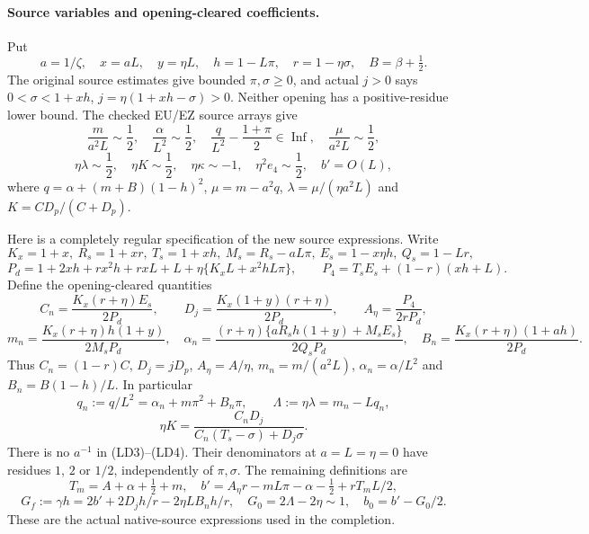 \paragraph{Source variables and opening-cleared coefficients.}
Put
\[
 a=1/\zeta,\quad x=aL,\quad y=\eta L,\quad
 h=1-L\pi,\quad r=1-\eta\sigma,\quad B=\beta+\tfrac12.
\]
The original source estimates give bounded $\pi,\sigma\ge0$, and
actual $j>0$ says
$0<\sigma<1+xh$, $j=\eta(1+xh-\sigma)>0$.
Neither opening has a positive-residue lower bound.
The checked EU/EZ source arrays give
\[
 \frac{m}{a^2L}\sim\frac12,\quad
 \frac{\alpha}{L^2}\sim\frac12,\quad
 \frac{q}{L^2}-\frac{1+\pi}{2}\in\operatorname{Inf},\quad
 \frac{\mu}{a^2L}\sim\frac12,
\]
\[
 \eta\lambda\sim\frac12,\quad
 \eta K\sim\frac12,\quad
 \eta\kappa\sim-1,\quad \eta^2e_4\sim\frac12,
 \quad b'=O(L),                                     \tag{LD2}
\]
where $q=\alpha+(m+B)(1-h)^2$, $\mu=m-a^2q$,
$\lambda=\mu/(\eta a^2L)$ and $K=CD_p/(C+D_p)$.

Here is a completely regular specification of the new source
expressions. Write
\[
 K_x=1+x,\ R_s=1+xr,\ T_s=1+xh,\ M_s=R_s-aL\pi,
 \ E_s=1-x\eta h,\ Q_s=1-Lr,
\]
\[
 P_d=1+2xh+rx^2h+rxL+L
                  +\eta\{K_xL+x^2hL\pi\},\qquad
 P_4=T_sE_s+(1-r)(xh+L).
\]
Define the opening-cleared quantities
\[
 C_n=\frac{K_x(r+\eta)E_s}{2P_d},\qquad
 D_j=\frac{K_x(1+y)(r+\eta)}{2P_d},\qquad
 A_\eta=\frac{P_4}{2rP_d},
\]
\[
 m_n=\frac{K_x(r+\eta)h(1+y)}{2M_sP_d},\quad
 \alpha_n=\frac{(r+\eta)\{aR_sh(1+y)+M_sE_s\}}
                         {2Q_sP_d},\quad
 B_n=\frac{K_x(r+\eta)(1+ah)}{2P_d}.                 \tag{LD3}
\]
Thus $C_n=(1-r)C$, $D_j=jD_p$, $A_\eta=A/\eta$,
$m_n=m/(a^2L)$, $\alpha_n=\alpha/L^2$ and
$B_n=B(1-h)/L$. In particular
\[
 q_n:=q/L^2=\alpha_n+m\pi^2+B_n\pi,\qquad
 \Lambda:=\eta\lambda=m_n-Lq_n,
\]
\[
 \eta K=\frac{C_nD_j}
                  {C_n(T_s-\sigma)+D_j\sigma}.       \tag{LD4}
\]
There is no $a^{-1}$ in (LD3)--(LD4). Their denominators at
$a=L=\eta=0$ have residues $1$, $2$ or $1/2$, independently
of $\pi,\sigma$. The remaining definitions are
\[
 T_m=A+\alpha+\tfrac12+m,\quad
 b'=A_\eta r-mL\pi-\alpha-\tfrac12+rT_mL/2,
\]
\[
 G_f:=\gamma h=2b'+2D_jh/r-2\eta LB_nh/r,
 \quad G_0=2\Lambda-2\eta\sim1,\quad b_0=b'-G_0/2.
                                                               \tag{LD5}
\]
These are the actual native-source expressions used in the completion.


